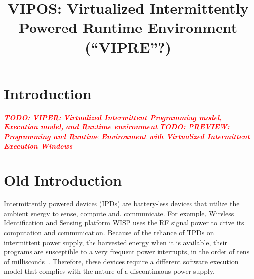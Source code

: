 \documentclass[sigconf,anonymous,review]{acmart}
\newcommand{\TODO}[1]{{\bf \em \textcolor{red}{TODO: #1}\xspace}}
\begin{document}
\title{VIPOS: Virtualized Intermittently Powered Runtime Environment (``VIPRE''?)}



\begin{abstract}

\end{abstract}

\maketitle

\section{Introduction}
\label{sec:intro}
\TODO{VIPER: Virtualized Intermittent Programming model, Execution model, and Runtime environment}
\TODO{PREVIEW: Programming and Runtime Environment with Virtualized Intermittent Execution Windows}





\section{Old Introduction}
	Intermittently powered devices (IPDs) are battery-less devices that utilize the ambient energy to sense, compute and, communicate. For example, Wireless Identification and Sensing platform WISP \cite{wisp} uses the RF signal power to drive its computation and communication. Because of the reliance of TPDs on intermittent power supply, the harvested energy when it is available, their programs are susceptible to a very frequent power interrupts, in the order of tens of millisconds~\cite{}. Therefore, these devices require a different software execution model that complies with the nature of a discontinuous power supply. 
\end{document}
